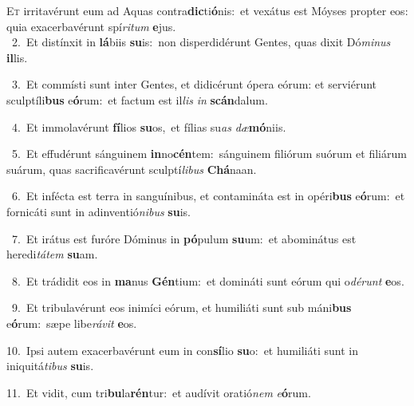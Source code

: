 \lettrine{\initial\textcolor{\initialcolor}{E}}{t} irritavérunt eum ad Aquas contra\-\textbf{dic}\-ti\-\textbf{ó}\-nis:~\star et vexátus est Móyses propter eos: quia exacerbavérunt spí\-\textit{ri}\-\textit{tum} \textbf{e}\-jus.\\
{\numbfont\textcolor{\numbcolor}{~2.}}~Et distínxit in \textbf{lá}\-biis \textbf{su}\-is:~\star non disperdidérunt Gentes, quas dixit Dó\-\textit{mi}\-\textit{nus} \textbf{il}\-lis.\par
{\numbfont\textcolor{\numbcolor}{~3.}}~Et commísti sunt inter Gentes, et didicérunt ópera eórum: et serviérunt sculptíli\textbf{bus} e\-\textbf{ó}\-rum:~\star et factum est il\textit{lis} \textit{in} \textbf{scán}\-dalum.\par
{\numbfont\textcolor{\numbcolor}{~4.}}~Et immolavérunt \textbf{fí}\-lios \textbf{su}\-os,~\star et fílias su\textit{as} \textit{dæ}\-\textbf{mó}niis.\par
{\numbfont\textcolor{\numbcolor}{~5.}}~Et effudérunt sánguinem \textbf{in}\-no\-\textbf{cén}\-tem:~\star sánguinem filiórum suórum et filiárum suárum, quas sacrificavérunt sculptí\-\textit{li}\-\textit{bus} \textbf{Chá}\-naan.\par
{\numbfont\textcolor{\numbcolor}{~6.}}~Et infécta est terra in sanguínibus, et contamináta est in opéri\textbf{bus} e\-\textbf{ó}\-rum:~\star et fornicáti sunt in adinventió\-\textit{ni}\-\textit{bus} \textbf{su}\-is.\par
{\numbfont\textcolor{\numbcolor}{~7.}}~Et irátus est furóre Dóminus in \textbf{pó}\-pulum \textbf{su}\-um:~\star et abominátus est heredi\-\textit{tá}\-\textit{tem} \textbf{su}\-am.\par
{\numbfont\textcolor{\numbcolor}{~8.}}~Et trádidit eos in \textbf{ma}\-nus \textbf{Gén}\-tium:~\star et domináti sunt eórum qui o\-\textit{dé}\-\textit{runt} \textbf{e}\-os.\par
{\numbfont\textcolor{\numbcolor}{~9.}}~Et tribulavérunt eos inimíci eórum, et humiliáti sunt sub máni\textbf{bus} e\-\textbf{ó}\-rum:~\star sæpe libe\-\textit{rá}\-\textit{vit} \textbf{e}\-os.\par
{\numbfont\textcolor{\numbcolor}{10.}}~Ipsi autem exacerbavérunt eum in con\-\textbf{sí}\-lio \textbf{su}\-o:~\star et humiliáti sunt in iniquitá\-\textit{ti}\-\textit{bus} \textbf{su}\-is.\par
{\numbfont\textcolor{\numbcolor}{11.}}~Et vidit, cum tri\-\textbf{bu}\-la\-\textbf{rén}\-tur:~\star et audívit oratió\textit{nem} \textit{e}\-\textbf{ó}rum.\par
